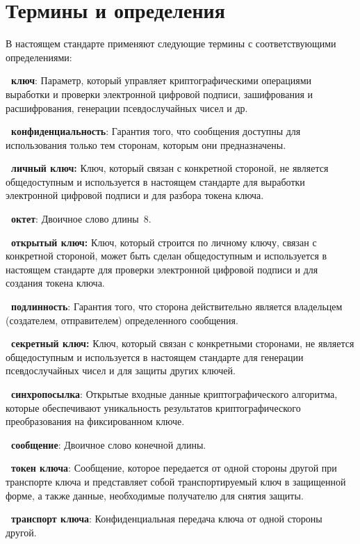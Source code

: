 \chapter{Термины и определения}\label{TERMS}

В настоящем стандарте применяют
следующие термины с соответствующими определениями:

{\bf \thedefctr~ключ}:
Параметр, который управляет криптографическими операциями 
выработки и проверки электронной цифровой подписи, 
зашифрования и расшифрования,
генерации псевдослучайных чисел и др.

{\bf \thedefctr~конфиденциальность}:
Гарантия того, что сообщения доступны для использования
только тем сторонам, которым они предназначены.
%

{\bf \thedefctr~личный ключ:}
Ключ, который связан с конкретной стороной, не является общедоступным
и используется в настоящем стандарте для выработки электронной цифровой
подписи и для разбора токена ключа.

{\bf \thedefctr~октет}:
Двоичное слово длины~$8$.

{\bf \thedefctr~открытый ключ:}
Ключ, который строится по личному ключу, 
связан с конкретной стороной, может быть сделан общедоступным
и используется в настоящем стандарте для проверки электронной цифровой 
подписи и для создания токена ключа.

{\bf \thedefctr~подлинность}:
Гарантия того, что сторона действительно является
владельцем (создателем, отправителем) определенного сообщения.

{\bf \thedefctr~секретный ключ:}
Ключ, который связан с конкретными сторонами, не является общедоступным
и используется в настоящем стандарте для генерации псевдослучайных
чисел и для защиты других ключей.

{\bf \thedefctr~синхропосылка}:
Открытые входные данные криптографического алгоритма,
которые обеспечивают уникальность результатов 
криптографического преобразования на фиксированном ключе.

{\bf \thedefctr~сообщение}:
Двоичное слово конечной длины.

{\bf \thedefctr~токен ключа}:
Сообщение, которое передается от одной стороны другой
при транспорте ключа и представляет 
собой транспортируемый ключ в защищенной форме, а также данные,
необходимые получателю для снятия защиты.

{\bf \thedefctr~транспорт ключа}:
Конфиденциальная передача ключа от одной стороны другой.

